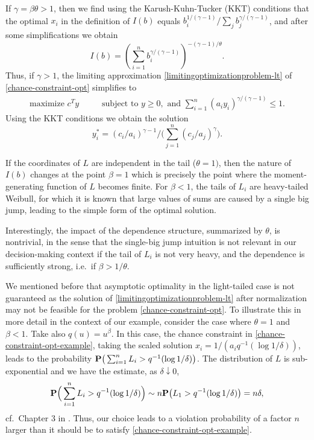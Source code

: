\documentclass[a4paper, a4wide, 10pt, reqno]{amsart}
\theoremstyle{plain}
\begin{document}
    If $\gamma=\beta\theta > 1$, then we find using the Karush-Kuhn-Tucker (KKT) conditions that the optimal $x_i$ in the definition of $I(b)$ equals $b_i^{1/(\gamma-1)}/ \sum_j b_j^{\gamma/(\gamma-1)}$, and after some simplifications we obtain
    \begin{equation}
        I(b) =\left(\sum_{i=1}^n b_i^{\gamma/(\gamma-1)}\right)^{- (\gamma-1)/\theta}.
    \end{equation}
Thus, if $\gamma>1$, 
the limiting approximation \eqref{limitingoptimizationproblem-lt} of \eqref{chance-constraint-opt} simplifies to
\begin{align}
\label{chance-constraint-opt-example-lt2}%
\mbox{maximize }  c^Ty \hspace{1cm}
\mbox{ subject to } y\geq 0, \mbox{ and } 
\sum_{i=1}^n (a_iy_i)^{\gamma/(\gamma-1)} \leq 1.
\end{align}
Using the KKT conditions we obtain the solution
\begin{equation}
    y_i^\ast = (c_i/a_i)^{\gamma-1}/\Big(\sum_{j=1}^n (c_j/a_j)^\gamma\Big).
\end{equation}

If the coordinates of $L$ are independent in the tail ($\theta=1)$, then the nature of $I(b)$ changes at the point $\beta=1$ which is precisely the point 
where the moment-generating function of $L$ becomes finite. For  $\beta<1$, the tails of $L_i$ are heavy-tailed Weibull, for which it is known that
large values of sums are caused by a single big jump, leading to the simple form of the optimal solution. 

Interestingly, the impact of the dependence structure, summarized by $\theta$, is nontrivial, in the sense that the single-big jump intuition is not relevant in our decision-making context if the tail of $L_i$ is not very heavy, and the dependence is sufficiently strong, i.e.\ if $\beta > 1/\theta$. 

We mentioned before that asymptotic optimality in the light-tailed case is not guaranteed as the solution of \eqref{limitingoptimizationproblem-lt} after normalization may not be feasible for the problem \eqref{chance-constraint-opt}. To illustrate this in more detail in the context of our example, consider the case where $\theta=1$
and $\beta < 1$. Take also $q(u)=u^\beta$. In this case, the chance 
constraint in \eqref{chance-constraint-opt-example}, taking the scaled solution
$x_i = 1/(a_i q^{-1}(\log 1/\delta))$, leads to the probability 
${\bf P}\big(\sum_{i=1}^n L_i > q^{-1}(\log 1/\delta)\big)$. 
The distribution of $L$ is sub-exponential and we have the estimate, as $\delta\downarrow 0$, 
\begin{equation}
{\bf P}\Big(\sum_{i=1}^n L_i > q^{-1}(\log 1/\delta)\Big) \sim n {\bf P}\big(L_1> q^{-1}(\log 1/\delta)\big) = n\delta,
\end{equation}
cf.\ Chapter 3 in \cite{NWZ22}. Thus, our choice leads to a violation probability of a factor $n$ larger than it should be to satisfy \eqref{chance-constraint-opt-example}.
\end{document}

